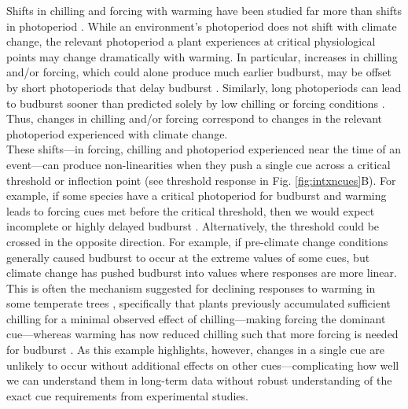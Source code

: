 \documentclass[11pt,letter]{article}
\begin{document}
Shifts in chilling and forcing with warming have been studied far more than shifts in photoperiod \citep[but see][]{saikkonen2012,way2015}. While an environment's photoperiod does not shift with climate change, the relevant photoperiod a plant experiences at critical physiological points may change dramatically with warming. In particular, increases in chilling and/or forcing, which could alone produce much earlier budburst, may be offset by short photoperiods that delay budburst \citep{gauzere2019}. Similarly, long photoperiods can lead to budburst sooner than predicted solely by low chilling or forcing conditions \citep{Nienstaedt:1966aa,Myking:1995,Partanen:1998aa}. Thus, changes in chilling and/or forcing correspond to changes in the relevant photoperiod experienced with climate change. \\

These shifts---in forcing, chilling and photoperiod experienced near the time of an event---can produce non-linearities when they push a single cue across a critical threshold or inflection point (see threshold response in Fig. \ref{fig:intxncues}B). For example, if some species have a critical photoperiod for budburst and warming leads to forcing cues met before the critical threshold, then we would expect incomplete or highly delayed budburst \citep{Singh:2017,rinne2018}. Alternatively, the threshold could be crossed in the opposite direction. For example, if pre-climate change conditions generally caused budburst to occur at the extreme values of some cues, but climate change has pushed budburst into values where responses are more linear. This is often the mechanism suggested for declining responses to warming in some temperate trees \citep{fu2015,piao2017,gauzere2019}, specifically that plants previously accumulated sufficient chilling for a minimal observed effect of chilling---making forcing the dominant cue---whereas warming has now reduced chilling such that more forcing is needed for budburst \citep[producing an overall muted effect when estimated as change in days per $\degree$C, see][for one example]{fu2015}. As this example highlights, however, changes in a single cue are unlikely to occur without additional effects on other cues---complicating how well we can understand them in long-term data without robust understanding of the exact cue requirements from experimental studies.\\
\end{document}
